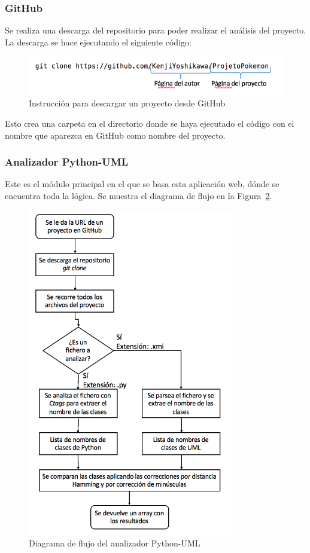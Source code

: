 \documentclass[a4paper, 12pt]{book}
\begin{document}
\subsubsection{GitHub}
\label{subsubsec:github}
Se realiza una descarga del repositorio para poder realizar el análisis del proyecto. La descarga
se hace ejecutando el siguiente código:

\begin{figure}[htb]
  \centering
  \includegraphics[width=12cm, keepaspectratio]{img/codigo-git}
  \caption{Instrucción para descargar un proyecto desde GitHub}
  \label{fig:codigogit}
\end{figure}

Esto crea una carpeta en el directorio donde se haya ejecutado el código con el nombre que aparezca
en GitHub como nombre del proyecto.

\subsubsection{Analizador Python-UML}
\label{subsubsec:analizadorpyuml}
Este es el módulo principal en el que se basa esta aplicación web, dónde se encuentra toda la lógica. Se muestra el diagrama de flujo en la Figura~\ref{fig:flujoanalizador}.

\begin{figure}[htb]
  \centering
  \includegraphics[width=9cm, keepaspectratio]{img/flujoanalizador}
  \caption{Diagrama de flujo del analizador Python-UML}
  \label{fig:flujoanalizador}
\end{figure}
\end{document}
